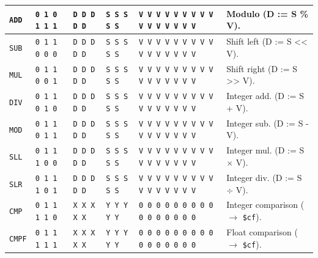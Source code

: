 \documentclass[a5paper]{report}
\begin{document}
{\begin{center}
{\begin{tabular}[ht]{
	| p{0.07 \textheight} | p{0.093 \textheight} | p{0.077 \textheight} | p{0.077 \textheight}
	| p{0.26 \textheight} | p{0.2 \textheight} |
}
	\texttt{ADD} & \texttt{0 1 0 1 1 1} & \texttt{D D D D D} & \texttt{S S S S S} &
		\texttt{V V V V V V V V V V V V V V V V} & Modulo (D := S \% V). \\
	\hline
	
	\texttt{SUB} & \texttt{0 1 1 0 0 0} & \texttt{D D D D D} & \texttt{S S S S S} &
		\texttt{V V V V V V V V V V V V V V V V} & Shift left (D := S << V). \\
	\hline
	
	\texttt{MUL} & \texttt{0 1 1 0 0 1} & \texttt{D D D D D} & \texttt{S S S S S} &
		\texttt{V V V V V V V V V V V V V V V V} & Shift right (D := S >> V). \\
	\hline
	
	\texttt{DIV} & \texttt{0 1 1 0 1 0} & \texttt{D D D D D} & \texttt{S S S S S} &
		\texttt{V V V V V V V V V V V V V V V V} & Integer add. (D := S + V). \\
	\hline
	
	\texttt{MOD} & \texttt{0 1 1 0 1 1} & \texttt{D D D D D} & \texttt{S S S S S} &
		\texttt{V V V V V V V V V V V V V V V V} & Integer sub. (D := S - V). \\
	\hline
	
	\texttt{SLL} & \texttt{0 1 1 1 0 0} & \texttt{D D D D D} & \texttt{S S S S S} &
		\texttt{V V V V V V V V V V V V V V V V} & Integer mul. (D := S $\times$ V). \\
	\hline
	
	\texttt{SLR} & \texttt{0 1 1 1 0 1} & \texttt{D D D D D} & \texttt{S S S S S} &
		\texttt{V V V V V V V V V V V V V V V V} & Integer div. (D := S $\div$ V). \\
	\hline
	
	\texttt{CMP} & \texttt{0 1 1 1 1 0} & \texttt{X X X X X} & \texttt{Y Y Y Y Y} &
		\texttt{0 0 0 0 0 0 0 0 0 0 0 0 0 0 0 0} & Integer comparison ($\rightarrow$ \texttt{\$cf}). \\
	\hline
	
	\texttt{CMPF} & \texttt{0 1 1 1 1 1} & \texttt{X X X X X} & \texttt{Y Y Y Y Y} &
		\texttt{0 0 0 0 0 0 0 0 0 0 0 0 0 0 0 0} & Float comparison ($\rightarrow$ \texttt{\$cf}). \\
	\hline
\end{tabular}
}
\end{center}
}
\end{document}
